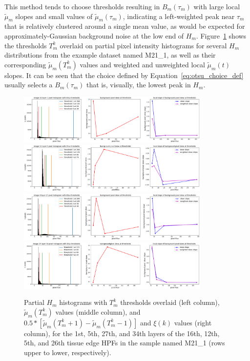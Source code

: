 \documentclass[letterpaper,11pt]{article}
\newcommand{\reffig}[1]{Figure~\ref{#1}}
\newcommand{\refeq}[1]{Equation~\ref{#1}}
\begin{document}
This method tends to choose thresholds resulting in $B_{m}(\tau_{m})$ with large local $\widetilde{\mu}_{m}$ slopes and small values of $\widetilde{\mu}_{m}(\tau_{m})$, indicating a left-weighted peak near $\tau_{m}$ that is relatively clustered around a single mean value, as would be expected for approximately-Gaussian background noise at the low end of $H_{m}$. \reffig{fig:histograms_with_otsu_thresholds} shows the thresholds $T^{k}_{m}$ overlaid on partial pixel intensity histograms for several $H_{m}$ distributions from the example dataset named M21\_1, as well as their corresponding $\widetilde{\mu}_{m}(T^{k}_{m})$ values and weighted and unweighted local $\widetilde{\mu}_{m}(t)$ slopes. It can be seen that the choice defined by \refeq{eq:otsu_choice_def} usually selects a $B_{m}(\tau_{m})$ that is, visually, the lowest peak in $H_{m}$.

\begin{figure}[!ht]
\centering
\includegraphics[width=0.85\textwidth]{images/masking/thresholds_image_15_layer_1}
\includegraphics[width=0.85\textwidth]{images/masking/thresholds_image_11_layer_5}
\includegraphics[width=0.85\textwidth]{images/masking/thresholds_image_4_layer_27}
\includegraphics[width=0.85\textwidth]{images/masking/thresholds_image_25_layer_34}
\caption{\footnotesize Partial $H_{m}$ histograms with $T^{k}_{m}$ thresholds overlaid (left column), $\widetilde{\mu}_{m}(T^{k}_{m})$ values (middle column), and $0.5*\left[\widetilde{\mu}_{m}(T^{k}_{m}+1) - \widetilde{\mu}_{m}(T^{k}_{m}-1)\right]$ and $\xi(k)$ values (right column), for the 1st, 5th, 27th, and 34th layers of the 16th, 12th, 5th, and 26th tissue edge HPFs in the sample named M21\_1 (rows upper to lower, respectively).}
\label{fig:histograms_with_otsu_thresholds}
\end{figure}
\end{document}
